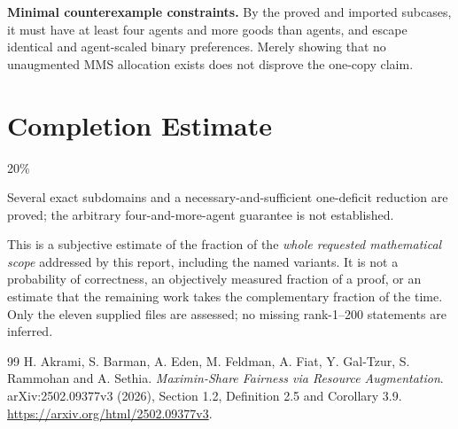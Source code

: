 \documentclass[11pt,a4paper]{article}
\theoremstyle{remark}\newtheorem{remark}[theorem]{Remark}
\begin{document}
\textbf{Minimal counterexample constraints.} By the proved and imported subcases, it must have at least four agents and more goods than agents, and escape identical and agent-scaled binary preferences. Merely showing that no unaugmented MMS allocation exists does not disprove the one-copy claim.

\section{Completion Estimate}
20\%

Several exact subdomains and a necessary-and-sufficient one-deficit reduction are proved; the arbitrary four-and-more-agent guarantee is not established.

This is a subjective estimate of the fraction of the \emph{whole requested mathematical scope} addressed by this report, including the named variants. It is not a probability of correctness, an objectively measured fraction of a proof, or an estimate that the remaining work takes the complementary fraction of the time. Only the eleven supplied files are assessed; no missing rank-1--200 statements are inferred.

\begin{thebibliography}{99}
 H. Akrami, S. Barman, A. Eden, M. Feldman, A. Fiat, Y. Gal-Tzur, S. Rammohan and A. Sethia. \emph{Maximin-Share Fairness via Resource Augmentation}. arXiv:2502.09377v3 (2026), Section 1.2, Definition 2.5 and Corollary 3.9. \url{https://arxiv.org/html/2502.09377v3}.
\end{thebibliography}
\end{document}
